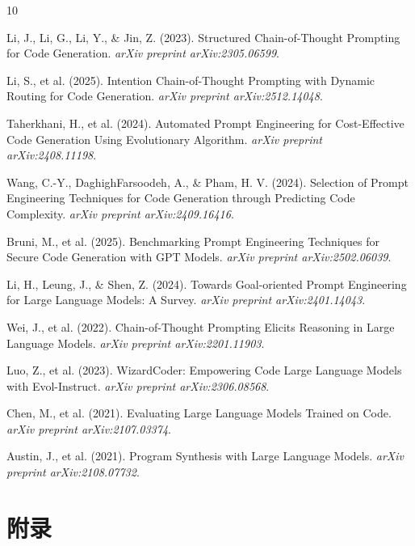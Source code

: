 \documentclass[11pt,a4paper]{article}
\begin{document}
\begin{thebibliography}{10}

Li, J., Li, G., Li, Y., \& Jin, Z. (2023). 
Structured Chain-of-Thought Prompting for Code Generation. 
\textit{arXiv preprint arXiv:2305.06599}.

Li, S., et al. (2025). 
Intention Chain-of-Thought Prompting with Dynamic Routing for Code Generation. 
\textit{arXiv preprint arXiv:2512.14048}.

Taherkhani, H., et al. (2024). 
Automated Prompt Engineering for Cost-Effective Code Generation Using Evolutionary Algorithm. 
\textit{arXiv preprint arXiv:2408.11198}.

Wang, C.-Y., DaghighFarsoodeh, A., \& Pham, H. V. (2024). 
Selection of Prompt Engineering Techniques for Code Generation through Predicting Code Complexity. 
\textit{arXiv preprint arXiv:2409.16416}.

Bruni, M., et al. (2025). 
Benchmarking Prompt Engineering Techniques for Secure Code Generation with GPT Models. 
\textit{arXiv preprint arXiv:2502.06039}.

Li, H., Leung, J., \& Shen, Z. (2024). 
Towards Goal-oriented Prompt Engineering for Large Language Models: A Survey. 
\textit{arXiv preprint arXiv:2401.14043}.

Wei, J., et al. (2022). 
Chain-of-Thought Prompting Elicits Reasoning in Large Language Models. 
\textit{arXiv preprint arXiv:2201.11903}.

Luo, Z., et al. (2023). 
WizardCoder: Empowering Code Large Language Models with Evol-Instruct. 
\textit{arXiv preprint arXiv:2306.08568}.

Chen, M., et al. (2021). 
Evaluating Large Language Models Trained on Code. 
\textit{arXiv preprint arXiv:2107.03374}.

Austin, J., et al. (2021). 
Program Synthesis with Large Language Models. 
\textit{arXiv preprint arXiv:2108.07732}.

\end{thebibliography}

\section*{附录}
\end{document}
